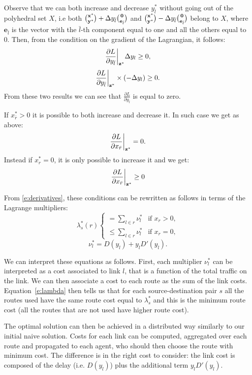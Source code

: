 Observe that we can both increase and decrease $y^*_{\bar l}$ without going out of the polyhedral set $X$, i.e both ${\mathbf{x}^* \choose \mathbf{y}^*}+ \Delta y_{\bar l}{\mathbf 0 \choose \mathbf e_{\bar l}} $ and ${\mathbf{x}^* \choose \mathbf{y}^*}- \Delta y_{\bar l}{\mathbf 0 \choose \mathbf e_{\bar l}} $ belong to $X$, where $\mathbf e_{\bar l}$ is the vector with the $\bar l$-th component equal to one and all the others equal to 0. Then, from the condition on the gradient of the Lagrangian, it follows:
$$ \frac{\partial L}{\partial y_{\bar l}}\bigg|_{\mathbf{z}^*} \Delta y_l \geq 0,$$
$$ \frac{\partial L}{\partial y_{\bar l}}\bigg|_{\mathbf{z}^*} \times (-\Delta y_l) \geq 0.$$
From these two results we can see that $\frac{\partial L}{\partial y_l}$ is equal to zero.


If $x^*_{\bar r}>0$ it is possible to both increase and decrease it. In such case we get as above:
$$ \frac{\partial L}{\partial x_{\bar r}}\bigg|_{\mathbf{z}^*}  = 0.$$
Instead if $x^*_r=0$, it is only possible to increase it and we
 get:
$$ \frac{\partial L}{\partial x_{\bar r}}\bigg|_{\mathbf{z}^*} \ge 0$$

From \eqref{e:derivatives}, these conditions can be rewritten as follows in terms of the Lagrange multipliers:
\begin{equation}
\label{e:lambda}
\lambda^*_s(r)
\begin{cases}
= \sum_{l \in r} \nu^*_l & \mbox{if } x_r > 0,\\
\leq \sum_{l \in r} \nu^*_l & \mbox{if } x_r = 0,
\end{cases}
\end{equation}
\begin{equation}
\label{e:nu}
\nu^*_l = D(y_l)+  y_l D'(y_l).
\end{equation} 

We can interpret these equations as follows. First, each multiplier  $\nu_l^*$ can be interpreted as a cost associated to link $l$, that is a function of the total traffic on the link. We can then associate a cost to each route as the sum of the link costs. Equation~\eqref{e:lambda} then tells us that for each source-destination pair $s$ all the routes used have the same route cost equal to $\lambda_s^*$ and this is the minimum route cost (all the routes that are not used have higher route cost).

The optimal solution can then be achieved in a distributed way similarly to our initial naive solution. Costs for each link can be computed, aggregated over each route and propagated to each agent, who should then choose the route with minimum cost. The difference is in the right cost to consider: the link cost is composed of the delay (i.e. $D(y_l)$) plus the additional term $y_l D'(y_l)$. 

